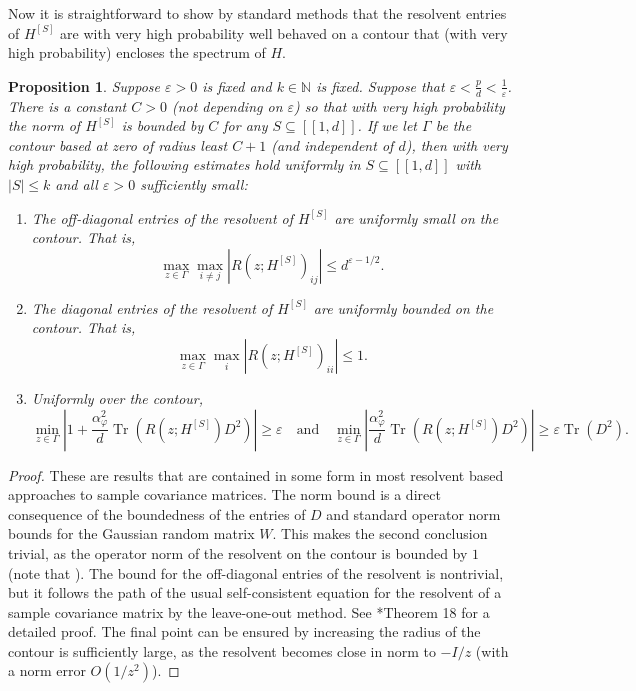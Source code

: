 \documentclass[letterpaper, 10pt, dvipsnames]{article}
\numberwithin{equation}{section}
\DeclareMathOperator{\Tr}{Tr}
\newcommand{\tr}{\Tr}
\newcommand{\N}{\mathbb{N}}
\renewcommand{\epsilon}{\varepsilon}
\renewcommand{\phi}{\varphi}
\newcommand{\unn}[2]{[\![#1,#2]\!]}
\newtheorem{prop}[ccounter]{Proposition}
\theoremstyle{definition}
\begin{document}
Now it is straightforward to show by standard methods that the resolvent entries of $H^{[S]}$ are with very high probability well behaved on a contour that (with very high probability) encloses the spectrum of $H$.
\begin{prop}\label{a:usual}
  Suppose $\epsilon > 0$ is fixed and $k \in \N$ is fixed.
  Suppose that $\epsilon < \frac{p}{d} < \frac{1}{\epsilon}$.
  There is a constant $C > 0$ (not depending on $\epsilon$) so that with very high probability the norm of $H^{[S]}$ is bounded by $C$ for any $S \subseteq \unn{1}{d}$.  If we let $\Gamma$ be the contour based at zero of radius least $C+1$ (and independent of $d$), then with very high probability, the following estimates hold uniformly in $S \subseteq \unn{1}{d}$ with $|S| \leq k$ and all $\epsilon >0$ sufficiently small:
  \begin{enumerate}
    \item The off-diagonal entries of the resolvent of $H^{[S]}$ are uniformly small on the contour. That is,
    \begin{equation}\label{a:usual1}
      \max_{z \in \Gamma}\max_{i \neq j} |R(z ; H^{[S]})_{ij}| \leq d^{\epsilon-1/2}.
    \end{equation}
    \item The diagonal entries of the resolvent of $H^{[S]}$ are uniformly bounded on the contour. That is,
    \begin{equation}\label{a:usual2}
      \max_{z \in \Gamma}\max_{i} |R(z ; H^{[S]})_{ii}| \leq 1.
    \end{equation}
    \item Uniformly over the contour,
    \[
    \min_{z \in \Gamma} \left| 1+ \frac{\alpha_\phi^2}{d}\tr(R(z;H^{[S]})D^2)\right| \geq \epsilon 
    \quad \text{and} \quad 
    \min_{z \in \Gamma} \left|\frac{\alpha_\phi^2}{d}\tr(R(z;H^{[S]})D^2)\right| \geq \epsilon \tr(D^2).
    \]
  \end{enumerate}
\end{prop}
\begin{proof}
  These are results that are contained in some form in most resolvent based approaches to sample covariance matrices.
  The norm bound is a direct consequence of the boundedness of the entries of $D$ and standard operator norm bounds for the Gaussian random matrix $W$.  This makes the second conclusion trivial, as the operator norm of the resolvent on the contour is bounded by $1$ (note that ).  The bound for the off-diagonal entries of the resolvent is nontrivial, but it follows the path of the usual self-consistent equation for the resolvent of a sample covariance matrix by the leave-one-out method.  See \cite{ElliotPaquetteNotes}*{Theorem 18} for a detailed proof.  The final point can be ensured by increasing the radius of the contour is sufficiently large, as the resolvent becomes close in norm to $-I/z$ (with a norm error $O(1/z^2)$).
\end{proof}
\end{document}
